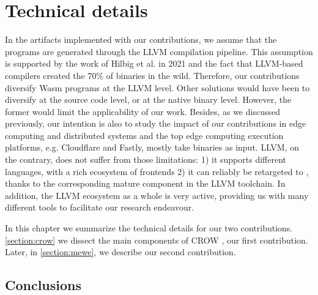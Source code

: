 \chapter{Technical details}
\label{chapter:technical}

In the artifacts implemented with our contributions, we assume that the \wasm programs are generated through the LLVM compilation pipeline. This assumption is supported by the work of Hilbig et al. \cite{Hilbig2021AnES} in 2021 and the fact that LLVM-based compilers created the 70\% of \wasm binaries in the wild. Therefore,
our contributions diversify Wasm programs at the LLVM level. Other solutions would have been to diversify at the source code level, or at the native binary level. However, the former would limit the applicability of our work. Besides, as we discussed previously, our intention is also to study the impact of our contributions in edge computing and distributed systems and the top edge computing execution platforms, e.g. Cloudflare and Fastly, mostly take \wasm binaries as input. 
LLVM, on the contrary, does not suffer from those limitations: 1) it supports different languages, with a rich ecosystem of frontends 2) it can reliably be retargeted to \wasm, thanks to the corresponding mature component in the LLVM toolchain. In addition, the LLVM ecosystem as a whole is very active, providing us with many different tools to facilitate our research endeavour.

In this chapter we summarize the technical details for our two contributions. \autoref{section:crow} we dissect the main components of CROW \cite{CROW}, our first contribution. Later, in \autoref{section:mewe}, we describe our second contribution.








\section*{Conclusions}